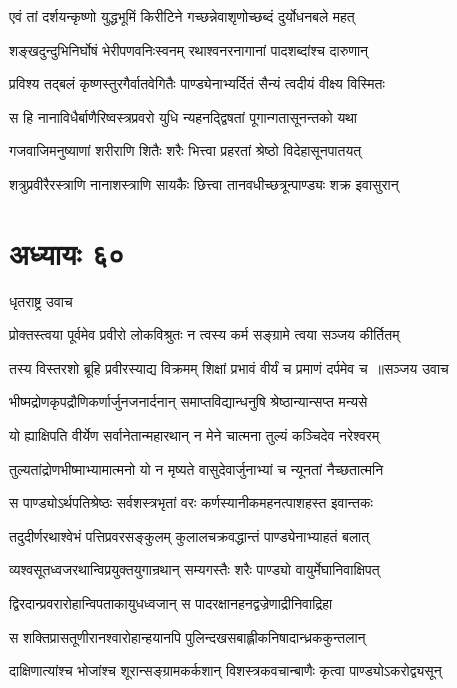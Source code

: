 \twolineshloka
{एवं तां दर्शयन्कृष्णो युद्धभूमिं किरीटिने}
{गच्छन्नेवाशृणोच्छब्दं दुर्योधनबले महत्}


\twolineshloka
{शङ्खदुन्दुभिनिर्घोषं भेरीपणवनिःस्वनम्}
{रथाश्वनरनागानां पादशब्दांश्च दारुणान्}


\twolineshloka
{प्रविश्य तद्बलं कृष्णस्तुरगैर्वातवेगितैः}
{पाण्ड्येनाभ्यर्दितं सैन्यं त्वदीयं वीक्ष्य विस्मितः}


\twolineshloka
{स हि नानाविधैर्बाणैरिष्वस्त्रप्रवरो युधि}
{न्यहनद्द्विषतां पूगान्गतासूनन्तको यथा}


\twolineshloka
{गजवाजिमनुष्याणां शरीराणि शितैः शरैः}
{भित्त्वा प्रहरतां श्रेष्ठो विदेहासूनपातयत्}


\twolineshloka
{शत्रुप्रवीरैरस्त्राणि नानाशस्त्राणि सायकैः}
{छित्त्वा तानवधीच्छत्रून्पाण्ड्यः शक्र इवासुरान्}


\chapter{अध्यायः ६०}
\twolineshloka
{धृतराष्ट्र उवाच}
{}


\twolineshloka
{प्रोक्तस्त्वया पूर्वमेव प्रवीरो लोकविश्रुतः}
{न त्वस्य कर्म सङ्ग्रामे त्वया सञ्जय कीर्तितम्}


\threelineshloka
{तस्य विस्तरशो ब्रूहि प्रवीरस्याद्य विक्रमम्}
{शिक्षां प्रभावं वीर्यं च प्रमाणं दर्पमेव च ॥सञ्जय उवाच}
{}


\twolineshloka
{भीष्मद्रोणकृपद्रौणिकर्णार्जुनजनार्दनान्}
{समाप्तविद्यान्धनुषि श्रेष्ठान्यान्सप्त मन्यसे}


\twolineshloka
{यो ह्याक्षिपति वीर्येण सर्वानेतान्महारथान्}
{न मेने चात्मना तुल्यं कञ्चिदेव नरेश्वरम्}


\twolineshloka
{तुल्यतांद्रोणभीष्माभ्यामात्मनो यो न मृष्यते}
{वासुदेवार्जुनाभ्यां च न्यूनतां नैच्छतात्मनि}


\twolineshloka
{स पाण्ड्योऽर्थपतिश्रेष्ठः सर्वशस्त्रभृतां वरः}
{कर्णस्यानीकमहनत्पाशहस्त इवान्तकः}


\twolineshloka
{तदुदीर्णरथाश्वेभं पत्तिप्रवरसङ्कुलम्}
{कुलालचक्रवद्धान्तं पाण्ड्येनाभ्याहतं बलात्}


\twolineshloka
{व्यश्वसूतध्वजरथान्विप्रयुक्तयुगान्रथान्}
{सम्यगस्तैः शरैः पाण्ड्यो वायुर्मेघानिवाक्षिपत्}


\twolineshloka
{द्विरदान्प्रवरारोहान्विपताकायुधध्वजान्}
{स पादरक्षानहनद्वज्रेणाद्रीनिवाद्रिहा}


\twolineshloka
{स शक्तिप्रासतूणीरानश्वारोहान्हयानपि}
{पुलिन्दखसबाह्लीकनिषादान्ध्रककुन्तलान्}


\twolineshloka
{दाक्षिणात्यांश्च भोजांश्च शूरान्सङ्ग्रामकर्कशान्}
{विशस्त्रकवचान्बाणैः कृत्वा पाण्ड्योऽकरोद्व्यसून्}


